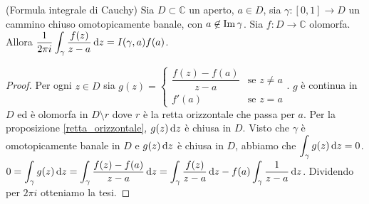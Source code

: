 \begin{thm}
  (Formula integrale di Cauchy) Sia $D \subset \mathbb{C}$ un aperto, $a \in D$, sia $\gamma:[0,1] \longrightarrow D$ un cammino chiuso omotopicamente banale, con $a \not\in \operatorname{Im}{\gamma}$. Sia $f:D \longrightarrow \mathbb{C}$ olomorfa. Allora $\displaystyle \frac{1}{2\pi i}\int_{\gamma} \frac{f(z)}{z-a}\mathop{}\!\mathrm{d} z=I(\gamma, a)f(a)$.
\end{thm}

\begin{proof}
  Per ogni $z \in D$ sia $g(z)=\begin{cases}
    \dfrac{f(z)-f(a)}{z-a} & \mbox{se }z\not=a\\
    f'(a) & \mbox{se }z=a
\end{cases}$. $g$ è continua in $D$ ed è olomorfa in $D \setminus r$ dove $r$ è la retta orizzontale che passa per $a$.
Per la proposizione \ref{retta_orizzontale}, $g(z)\mathop{}\!\mathrm{d} z$ è chiusa in $D$. Visto che $\gamma$ è omotopicamente banale in $D$ e $g(z)\mathop{}\!\mathrm{d} z$ è chiusa in $D$, abbiamo che $\displaystyle \int_{\gamma}g(z)\mathop{}\!\mathrm{d} z=0$.
$\displaystyle 0=\int_{\gamma} g(z)\mathop{}\!\mathrm{d} z=\int_{\gamma} \frac{f(z)-f(a)}{z-a}\mathop{}\!\mathrm{d} z=\int_{\gamma} \frac{f(z)}{z-a}\mathop{}\!\mathrm{d} z-f(a)\int_{\gamma} \frac{1}{z-a}\mathop{}\!\mathrm{d} z$. Dividendo per $2\pi i$ otteniamo la tesi.
\end{proof}
